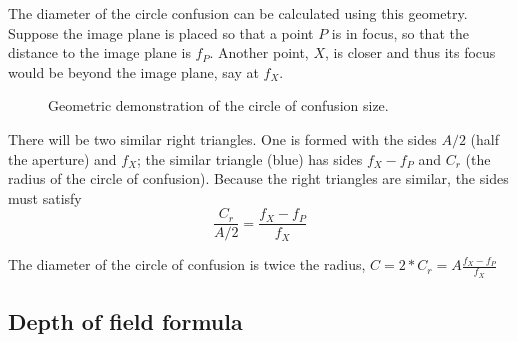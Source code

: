 \documentclass[
  letterpaper,
]{book}
\begin{document}
\begin{tcolorbox}[enhanced jigsaw, titlerule=0mm, colback=white, left=2mm, colframe=quarto-callout-note-color-frame, breakable, rightrule=.15mm, bottomtitle=1mm, title=\textcolor{quarto-callout-note-color}{\faInfo}\hspace{0.5em}{Deriving the CoC formula}, opacitybacktitle=0.6, toprule=.15mm, colbacktitle=quarto-callout-note-color!10!white, toptitle=1mm, coltitle=black, arc=.35mm, leftrule=.75mm, opacityback=0, bottomrule=.15mm]

The diameter of the circle confusion can be calculated using this
geometry. Suppose the image plane is placed so that a point \(P\) is in
focus, so that the distance to the image plane is \(f_P\). Another
point, \(X\), is closer and thus its focus would be beyond the image
plane, say at \(f_X\).

\begin{figure}[H]


\caption{\label{fig-optics-coc-callout}Geometric demonstration of the
circle of confusion size.}

\end{figure}%

There will be two similar right triangles. One is formed with the sides
\(A/2\) (half the aperture) and \(f_X\); the similar triangle (blue) has
sides \(f_X - f_P\) and \(C_r\) (the radius of the circle of confusion).
Because the right triangles are similar, the sides must satisfy \[
\frac{C_r}{A/2} = \frac{f_X - f_P}{f_X}
\]

The diameter of the circle of confusion is twice the radius,
\(C = 2*C_r = A \frac{f_X - f_P}{f_X}\)

\end{tcolorbox}

\subsection{Depth of field formula}\label{sec-optics-dof-formula}
\end{document}
